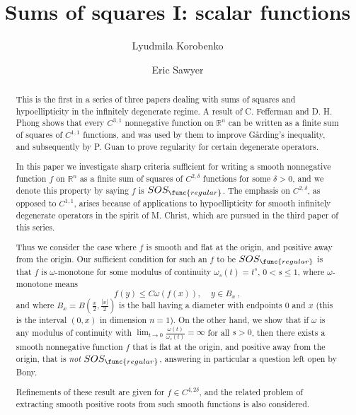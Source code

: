 \documentclass{amsart}
\theoremstyle{plain}
\numberwithin{equation}{section}
\begin{document}
	\title[Sums of squares I]{Sums of squares I: scalar functions}
	\author{Lyudmila Korobenko}
	\author{Eric Sawyer}
	\maketitle

\begin{abstract}
This is the first in a series of three papers dealing with sums of squares
and hypoellipticity in the infinitely degenerate regime. A result of C.
Fefferman and D. H. Phong shows that every $C^{3,1}$ nonnegative function on 
$\mathbb{R}^{n}$ can be written as a finite sum of squares of $C^{1,1}$
functions, and was used by them to improve G\aa rding's inequality, and
subsequently by P. Guan to prove regularity for certain degenerate operators.

In this paper we investigate sharp criteria sufficient for writing a smooth
nonnegative function $f$ on $\mathbb{R}^{n}$ as a finite sum of squares of $%
C^{2,\delta }$ functions for some $\delta >0$, and we denote this property
by saying $f$ is $SOS_{\func{regular}}$. The emphasis on $C^{2,\delta }$, as
opposed to $C^{1,1}$, arises because of applications to hypoellipticity for
smooth infinitely degenerate operators in the spirit of M. Christ, which are
pursued in the third paper of this series.

Thus we consider the case where $f$ is smooth and flat at the origin, and
positive away from the origin. Our sufficient condition for such an $f$ to
be $SOS_{\func{regular}}$ is that $f$ is $\omega $-monotone for some modulus
of continuity $\omega _{s}\left( t\right) =t^{s}$, $0<s\leq 1$, where $%
\omega $-monotone means 
\begin{equation*}
f\left( y\right) \leq C\omega \left( f\left( x\right) \right) ,\ \ \ \ \
y\in B_{x}\ ,
\end{equation*}%
and where $B_{x}=B\left( \frac{x}{2},\frac{\left\vert x\right\vert }{2}%
\right) $ is the ball having a diameter with endpoints $0$ and $x$ (this is
the interval $\left( 0,x\right) $ in dimension $n=1$). On the other hand, we
show that if $\omega $ is any modulus of continuity with $\lim_{t\rightarrow
0}\frac{\omega \left( t\right) }{\omega _{s}\left( t\right) }=\infty $ for
all $s>0$, then there exists a smooth nonnegative function $f$ that is flat
at the origin, and positive away from the origin, that is \emph{not} $SOS_{%
\func{regular}}$, answering in particular a question left open by Bony.

Refinements of these result are given for $f\in C^{4,2\delta }$, and the
related problem of extracting smooth positive roots from such smooth
functions is also considered.
\end{abstract}
\end{document}
